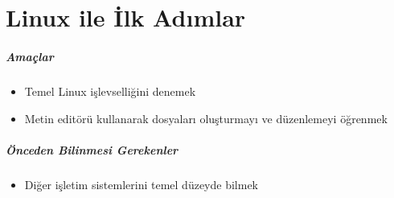 \documentclass[10pt,a5paper]{book}
\begin{document}
\chapter{Linux ile İlk Adımlar}


\paragraph{Amaçlar}
\begin{itemize}
 \item Temel Linux işlevselliğini denemek
 \item Metin editörü kullanarak dosyaları oluşturmayı ve düzenlemeyi öğrenmek
 \end{itemize}
 
\paragraph{Önceden Bilinmesi Gerekenler}
\begin{itemize}
 \item Diğer işletim sistemlerini temel düzeyde bilmek
 \end{itemize}
\end{document}
